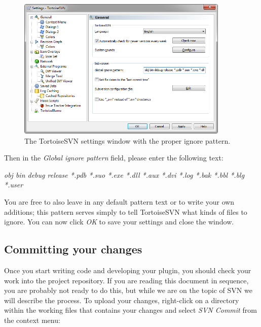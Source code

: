 \begin{figure}[h!]
	\centering
		\includegraphics[width=0.90\textwidth]{figures/tortoise_svn_ignore_patterns.png}
	\caption{The TortoiseSVN settings window with the proper ignore pattern.}
	\label{fig:tortoise_svn_ignore_patterns}
\end{figure}

\noindent Then in the \textit{Global ignore pattern} field, please enter the following text:

\begin{center}
\textit{obj bin debug release *.pdb *.suo *.exe *.dll *.aux *.dvi *.log *.bak *.bbl *.blg *.user}
\end{center}

You are free to also leave in any default pattern text or to write your own additions; this pattern serves simply to tell TortoiseSVN what kinds of files to ignore. You can now click \textit{OK} to save your settings and close the window.
\clearpage

\subsection{Committing your changes}
\label{CommitingYourChanges}

Once you start writing code and developing your plugin, you should check your work into the project repository. If you are reading this document in sequence, you are probably not ready to do this, but while we are on the topic of SVN we will describe the process. To upload your changes, right-click on a directory within the working files that contains your changes and select \textit{SVN Commit} from the context menu:

